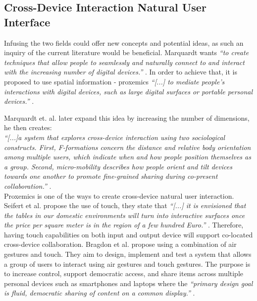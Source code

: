 \subsection{Cross-Device Interaction Natural User Interface}
Infusing the two fields could offer new concepts and potential ideas, as such an inquiry of the current literature would be beneficial. 
Marquardt wants {\em``to create techniques that allow people to seamlessly and naturally connect to and interact with the increasing number of digital devices.''} \cite{Marquardt:2011}. 
In order to achieve that, it is proposed to use spatial information - proxemics {\em``[...] to mediate people's interactions with digital devices, such as large digital surfaces or portable personal devices.''} \cite{Marquardt:2011}.

Marquardt et. al. later expand this idea by increasing the number of dimensions, he then creates: \\

{\em``[...]a system that explores cross-device interaction using two sociological constructs. First, F-formations concern the distance and relative body orientation among multiple users, which indicate when and how people position themselves as a group. Second, micro-mobility describes how people orient and tilt devices towards one another to promote fine-grained sharing during co-present collaboration.''} \cite{Marquardt:2012}.\\

Proxemics is one of the ways to create cross-device natural user interaction.
Seifert et al. propose the use of touch, they state that {\em``[...] it is envisioned that the tables in our domestic environments will turn into interactive surfaces once the price per square meter is in the region of a few hundred Euro.''} \cite{Seifert:2012}. 
Therefore, having touch capabilities on both input and output device will support co-located cross-device collaboration.
Bragdon et al. propose using a combination of air gestures and touch. 
They aim to design, implement and test a system that allows a group of users to interact using air gestures and touch gestures. 
The purpose is to increase control, support democratic access, and share items across multiple personal devices such as smartphones and laptops where the {\em``primary design goal is fluid, democratic sharing of content on a common display.''} \cite{Bragton:2011}.